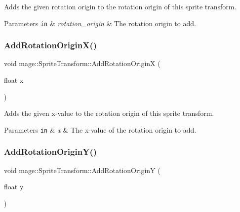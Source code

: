Adds the given rotation origin to the rotation origin of this sprite transform.


\begin{DoxyParams}[1]{Parameters}
\mbox{\tt in}  & {\em rotation\+\_\+origin} & The rotation origin to add. \\
\hline
\end{DoxyParams}
\hypertarget{structmage_1_1_sprite_transform_a2f3ad4009e58ba5b791d8aee2e4ee552}{}\label{structmage_1_1_sprite_transform_a2f3ad4009e58ba5b791d8aee2e4ee552} 
\subsubsection{\texorpdfstring{Add\+Rotation\+Origin\+X()}{AddRotationOriginX()}}
{\footnotesize\ttfamily void mage\+::\+Sprite\+Transform\+::\+Add\+Rotation\+OriginX (\begin{DoxyParamCaption}\item[{float}]{x }\end{DoxyParamCaption})\hspace{0.3cm}{\ttfamily [noexcept]}}

Adds the given x-\/value to the rotation origin of this sprite transform.


\begin{DoxyParams}[1]{Parameters}
\mbox{\tt in}  & {\em x} & The x-\/value of the rotation origin to add. \\
\hline
\end{DoxyParams}
\hypertarget{structmage_1_1_sprite_transform_aaf69e555ed7c83865ff56c3e85879707}{}\label{structmage_1_1_sprite_transform_aaf69e555ed7c83865ff56c3e85879707} 
\subsubsection{\texorpdfstring{Add\+Rotation\+Origin\+Y()}{AddRotationOriginY()}}
{\footnotesize\ttfamily void mage\+::\+Sprite\+Transform\+::\+Add\+Rotation\+OriginY (\begin{DoxyParamCaption}\item[{float}]{y }\end{DoxyParamCaption})\hspace{0.3cm}{\ttfamily [noexcept]}}

